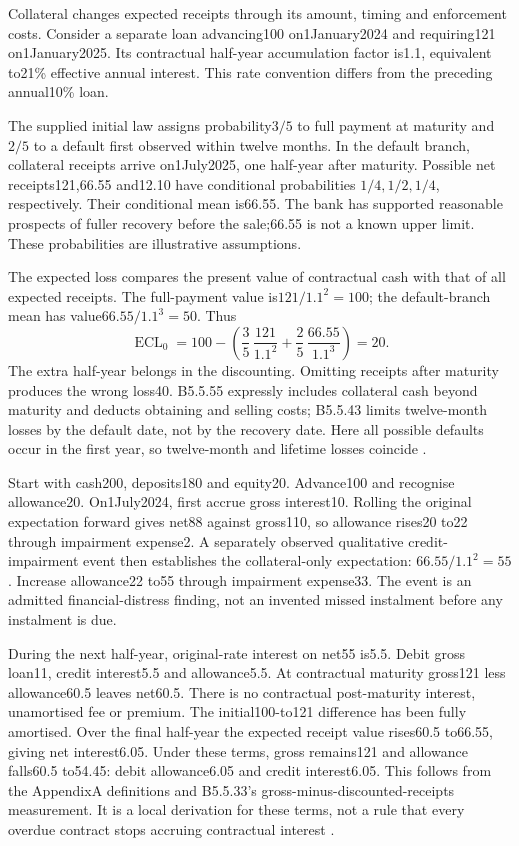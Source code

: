 Collateral changes expected receipts through its amount, timing and
enforcement costs. Consider a separate loan advancing100 on1January2024
and requiring121 on1January2025. Its contractual half-year accumulation
factor is1.1, equivalent to21\% effective annual interest. This rate
convention differs from the preceding annual10\% loan.

The supplied initial law assigns probability$3/5$ to full payment at maturity
and$2/5$ to a default first observed within twelve months. In the default
branch, collateral receipts arrive on1July2025, one half-year after maturity.
Possible net receipts121,66.55 and12.10 have conditional probabilities
$1/4,1/2,1/4$, respectively. Their conditional mean is66.55. The bank has
supported reasonable prospects of fuller recovery before the sale;66.55 is
not a known upper limit. These probabilities are illustrative assumptions.

The expected loss compares the present value of contractual cash with that
of all expected receipts. The full-payment value is$121/1.1^2=100$; the
default-branch mean has value$66.55/1.1^3=50$. Thus
\[
 \operatorname{ECL}_0
 =100-\left(\frac35\,\frac{121}{1.1^2}
              +\frac25\,\frac{66.55}{1.1^3}\right)=20.
\]
The extra half-year belongs in the discounting. Omitting receipts after
maturity produces the wrong loss40. B5.5.55 expressly includes collateral
cash beyond maturity and deducts obtaining and selling costs; B5.5.43
limits twelve-month losses by the default date, not by the recovery date.
Here all possible defaults occur in the first year, so twelve-month and
lifetime losses coincide \citep[B5.5.43--44 and B5.5.55]{aasb9dated}.

Start with cash200, deposits180 and equity20. Advance100 and recognise
allowance20. On1July2024, first accrue gross interest10. Rolling the
original expectation forward gives net88 against gross110, so allowance
rises20 to22 through impairment expense2. A separately observed qualitative
credit-impairment event then establishes the collateral-only expectation:
$66.55/1.1^2=55$. Increase allowance22 to55 through impairment expense33.
The event is an admitted financial-distress finding, not an invented missed
instalment before any instalment is due.

During the next half-year, original-rate interest on net55 is5.5.
Debit gross loan11, credit interest5.5 and allowance5.5. At contractual
maturity gross121 less allowance60.5 leaves net60.5. There is no contractual
post-maturity interest, unamortised fee or premium. The initial100-to121
difference has been fully amortised. Over the final half-year the expected
receipt value rises60.5 to66.55, giving net interest6.05. Under these terms,
gross remains121 and allowance falls60.5 to54.45: debit allowance6.05 and
credit interest6.05. This follows from the AppendixA definitions and
B5.5.33's gross-minus-discounted-receipts measurement. It is a local derivation
for these terms, not a rule that every overdue contract stops accruing
contractual interest \citep[AppendixA, paragraph5.4.1(b), B5.5.33]{aasb9dated}.

